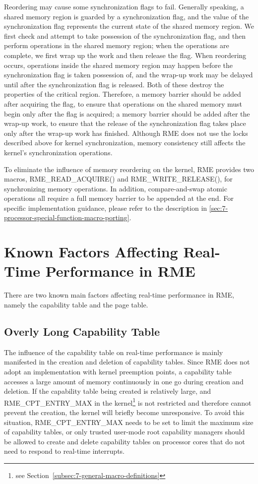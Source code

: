 Reordering may cause some synchronization flags to fail. Generally speaking, a shared memory region is guarded by a synchronization flag, and the value of the synchronization flag represents the current state of the shared memory region. We first check and attempt to take possession of the synchronization flag, and then perform operations in the shared memory region; when the operations are complete, we first wrap up the work and then release the flag. When reordering occurs, operations inside the shared memory region may happen before the synchronization flag is taken possession of, and the wrap-up work may be delayed until after the synchronization flag is released. Both of these destroy the properties of the critical region. Therefore, a memory barrier should be added after acquiring the flag, to ensure that operations on the shared memory must begin only after the flag is acquired; a memory barrier should be added after the wrap-up work, to ensure that the release of the synchronization flag takes place only after the wrap-up work has finished. Although RME does not use the locks described above for kernel synchronization, memory consistency still affects the kernel's synchronization operations.

To eliminate the influence of memory reordering on the kernel, RME provides two macros, RME\_READ\_ACQUIRE() and RME\_WRITE\_RELEASE(), for synchronizing memory operations. In addition, compare-and-swap atomic operations all require a full memory barrier to be appended at the end. For specific implementation guidance, please refer to the description in \ref{sec:7-processor-special-function-macro-porting}.

\section{Known Factors Affecting Real-Time Performance in RME}\label{sec:9-realtime-influencing-factors}

There are two known main factors affecting real-time performance in RME, namely the capability table and the page table.

\subsection{Overly Long Capability Table}\label{subsec:9-long-capability-table}

The influence of the capability table on real-time performance is mainly manifested in the creation and deletion of capability tables. Since RME does not adopt an implementation with kernel preemption points, a capability table accesses a large amount of memory continuously in one go during creation and deletion. If the capability table being created is relatively large, and RME\_CPT\_ENTRY\_MAX in the kernel\footnote{see Section~\ref{subsec:7-general-macro-definitions}} is not restricted and therefore cannot prevent the creation, the kernel will briefly become unresponsive. To avoid this situation, RME\_CPT\_ENTRY\_MAX needs to be set to limit the maximum size of capability tables, or only trusted user-mode root capability managers should be allowed to create and delete capability tables on processor cores that do not need to respond to real-time interrupts.

